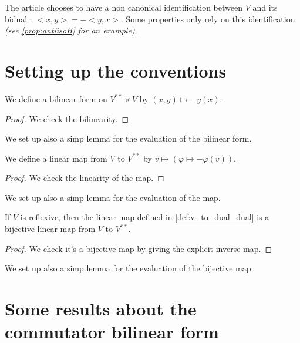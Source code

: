 The article chooses to have a non canonical identification between $V$ and its bidual :
$<x,y>=-<y,x>$. Some properties only rely on this identification
 \textit{(see \ref{prop:antiisoH} for an example)}.

\section{Setting up the conventions}

\begin{definition}
    \label{def:form_dual}
    \uses{}
    \leanok 

    We define a bilinear form on $V^{**}\times V$ by 
    $(x,y)\mapsto - y(x)$.
    \begin{proof}
        \leanok
        We check the bilinearity.
    \end{proof}
\end{definition}
We set up also a simp lemma for the evaluation of the bilinear form.

\begin{definition}
    \label{def:v_to_dual_dual}
    \uses{}
    \leanok 

    We define a linear map from $V$ to $V^{**}$ by 
    $v\mapsto (\varphi\mapsto -\varphi(v))$.
    \begin{proof}
        \leanok
        We check the linearity of the map.
    \end{proof}
\end{definition}
We set up also a simp lemma for the evaluation of the map.

\begin{proposition}
    \label{def:identification_dual}
    \leanok 

    If $V$ is reflexive, then the linear map defined in \ref{def:v_to_dual_dual} is
    a bijective linear map from $V$ to $V^{**}$.
    \begin{proof}
        \leanok
        We check it's a bijective map by giving the explicit inverse map.
    \end{proof}
\end{proposition}
We set up also a simp lemma for the evaluation of the bijective map.

\section{Some results about the commutator bilinear form}

